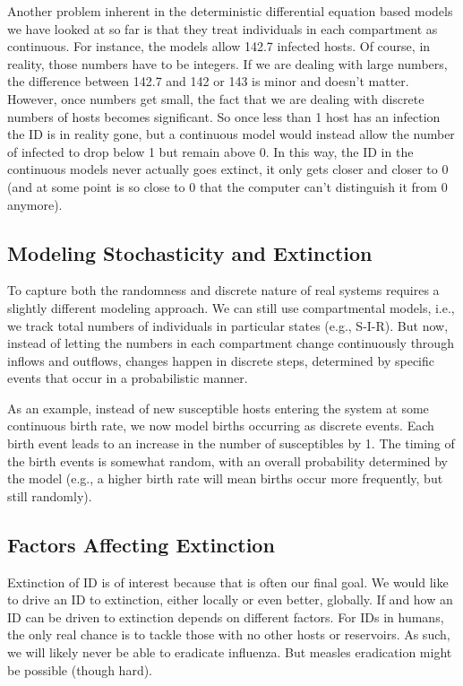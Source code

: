 \documentclass[]{article}
\theoremstyle{definition}
\theoremstyle{definition}
\theoremstyle{definition}
\theoremstyle{remark}
\begin{document}
Another problem inherent in the deterministic differential equation
based models we have looked at so far is that they treat individuals in
each compartment as continuous. For instance, the models allow 142.7
infected hosts. Of course, in reality, those numbers have to be
integers. If we are dealing with large numbers, the difference between
142.7 and 142 or 143 is minor and doesn't matter. However, once numbers
get small, the fact that we are dealing with discrete numbers of hosts
becomes significant. So once less than 1 host has an infection the ID is
in reality gone, but a continuous model would instead allow the number
of infected to drop below 1 but remain above 0. In this way, the ID in
the continuous models never actually goes extinct, it only gets closer
and closer to 0 (and at some point is so close to 0 that the computer
can't distinguish it from 0 anymore).

\subsection{Modeling Stochasticity and
Extinction}\label{modeling-stochasticity-and-extinction}

To capture both the randomness and discrete nature of real systems
requires a slightly different modeling approach. We can still use
compartmental models, i.e., we track total numbers of individuals in
particular states (e.g., S-I-R). But now, instead of letting the numbers
in each compartment change continuously through inflows and outflows,
changes happen in discrete steps, determined by specific events that
occur in a probabilistic manner.

As an example, instead of new susceptible hosts entering the system at
some continuous birth rate, we now model births occurring as discrete
events. Each birth event leads to an increase in the number of
susceptibles by 1. The timing of the birth events is somewhat random,
with an overall probability determined by the model (e.g., a higher
birth rate will mean births occur more frequently, but still randomly).

\subsection{Factors Affecting
Extinction}\label{factors-affecting-extinction}

Extinction of ID is of interest because that is often our final goal. We
would like to drive an ID to extinction, either locally or even better,
globally. If and how an ID can be driven to extinction depends on
different factors. For IDs in humans, the only real chance is to tackle
those with no other hosts or reservoirs. As such, we will likely never
be able to eradicate influenza. But measles eradication might be
possible (though hard).
\end{document}
